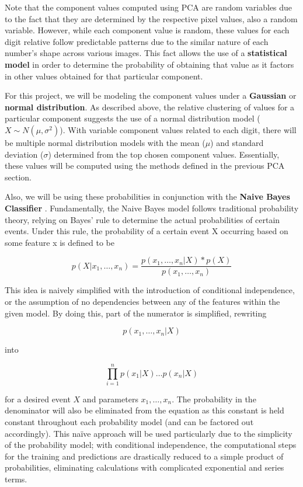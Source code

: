 \documentclass[twocolumn]{article}
\begin{document}
Note that the component values computed using PCA are random variables due to the fact that they are determined by the respective pixel values, also a random variable. However, while each component value is random, these values for each digit relative follow predictable patterns due to the similar nature of each number's shape across various images. This fact allows the use of a \textbf{statistical model} in order to determine the probability of obtaining that value as it factors in other values obtained for that particular component. 

For this project, we will be modeling the component values under a \textbf{Gaussian} or \textbf{normal distribution}. As described above, the relative clustering of values for a particular component suggests the use of a normal distribution model ($X \sim N(\mu, \sigma^2)$). With variable component values related to each digit, there will be multiple normal distribution models with the mean ($\mu$) and standard deviation ($\sigma$) determined from the top chosen component values. Essentially, these values will be computed using the methods defined in the previous PCA section. 

Also, we will be using these probabilities in conjunction with the \textbf{Naive Bayes Classifier} \cite{bayes}
. Fundamentally, the Naive Bayes model follows traditional probability theory, relying on Bayes' rule to determine the actual probabilities of certain events. Under this rule, the probability of a certain event X occurring based on some feature x is defined to be

$$p(X | x_1, \ldots, x_n) = \frac{p(x_1, \ldots, x_n | X) * p(X)}{p(x_1, \ldots, x_n)}$$

This idea is naively simplified with the introduction of conditional independence, or the assumption of no dependencies between any of the features within the given model. By doing this, part of the numerator is simplified, rewriting

$$p( x_1, \ldots, x_n | X) $$

into

$$\prod_{i=1}^{n}p(x_1 | X)\ldots p(x_n | X)$$

for a desired event $X$ and parameters $x_1,\ldots, x_n$. The probability in the denominator will also be eliminated from the equation as this constant is held constant throughout each probability model (and can be factored out accordingly). This naïve approach will be used particularly due to the simplicity of the probability model; with conditional independence, the computational steps for the training and predictions are drastically reduced to a simple product of probabilities, eliminating calculations with complicated exponential and series terms.
\end{document}
